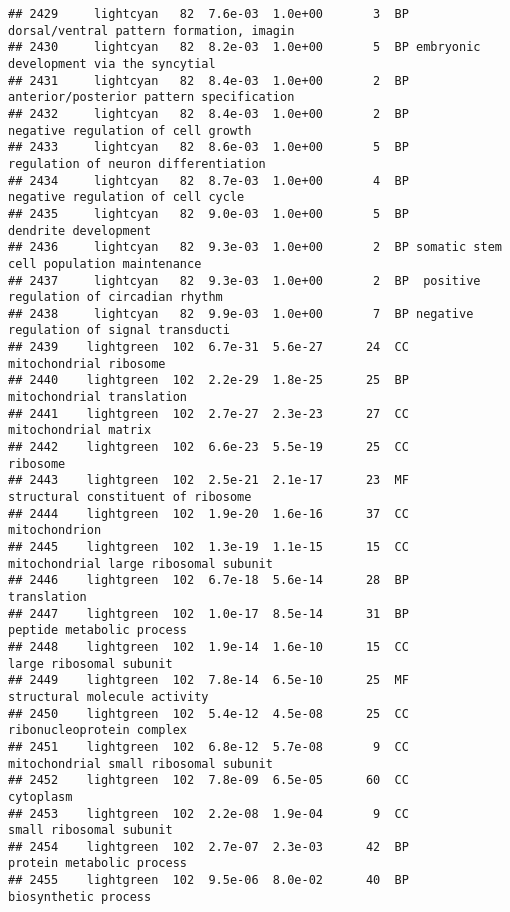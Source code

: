 \documentclass[]{article}
\begin{document}
\begin{verbatim}
## 2429     lightcyan   82  7.6e-03  1.0e+00       3  BP dorsal/ventral pattern formation, imagin
## 2430     lightcyan   82  8.2e-03  1.0e+00       5  BP embryonic development via the syncytial 
## 2431     lightcyan   82  8.4e-03  1.0e+00       2  BP anterior/posterior pattern specification
## 2432     lightcyan   82  8.4e-03  1.0e+00       2  BP       negative regulation of cell growth
## 2433     lightcyan   82  8.6e-03  1.0e+00       5  BP     regulation of neuron differentiation
## 2434     lightcyan   82  8.7e-03  1.0e+00       4  BP        negative regulation of cell cycle
## 2435     lightcyan   82  9.0e-03  1.0e+00       5  BP                     dendrite development
## 2436     lightcyan   82  9.3e-03  1.0e+00       2  BP somatic stem cell population maintenance
## 2437     lightcyan   82  9.3e-03  1.0e+00       2  BP  positive regulation of circadian rhythm
## 2438     lightcyan   82  9.9e-03  1.0e+00       7  BP negative regulation of signal transducti
## 2439    lightgreen  102  6.7e-31  5.6e-27      24  CC                   mitochondrial ribosome
## 2440    lightgreen  102  2.2e-29  1.8e-25      25  BP                mitochondrial translation
## 2441    lightgreen  102  2.7e-27  2.3e-23      27  CC                     mitochondrial matrix
## 2442    lightgreen  102  6.6e-23  5.5e-19      25  CC                                 ribosome
## 2443    lightgreen  102  2.5e-21  2.1e-17      23  MF       structural constituent of ribosome
## 2444    lightgreen  102  1.9e-20  1.6e-16      37  CC                            mitochondrion
## 2445    lightgreen  102  1.3e-19  1.1e-15      15  CC    mitochondrial large ribosomal subunit
## 2446    lightgreen  102  6.7e-18  5.6e-14      28  BP                              translation
## 2447    lightgreen  102  1.0e-17  8.5e-14      31  BP                peptide metabolic process
## 2448    lightgreen  102  1.9e-14  1.6e-10      15  CC                  large ribosomal subunit
## 2449    lightgreen  102  7.8e-14  6.5e-10      25  MF             structural molecule activity
## 2450    lightgreen  102  5.4e-12  4.5e-08      25  CC                ribonucleoprotein complex
## 2451    lightgreen  102  6.8e-12  5.7e-08       9  CC    mitochondrial small ribosomal subunit
## 2452    lightgreen  102  7.8e-09  6.5e-05      60  CC                                cytoplasm
## 2453    lightgreen  102  2.2e-08  1.9e-04       9  CC                  small ribosomal subunit
## 2454    lightgreen  102  2.7e-07  2.3e-03      42  BP                protein metabolic process
## 2455    lightgreen  102  9.5e-06  8.0e-02      40  BP                     biosynthetic process

\end{verbatim}
\end{document}
